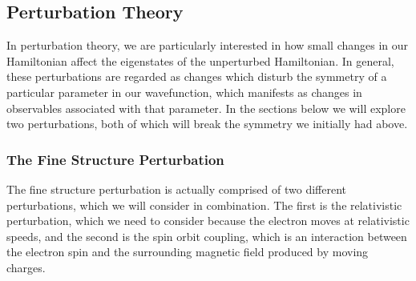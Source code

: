 \documentclass[10pt]{article}
\begin{document}
	\subsection{Perturbation Theory}
	In perturbation theory, we are particularly interested in how small changes in
	our Hamiltonian affect the eigenstates of the unperturbed Hamiltonian. In
	general, these perturbations are regarded as changes which disturb the symmetry
	of a particular parameter in our wavefunction, which manifests as changes in
	observables associated with that parameter. In the sections below we will
	explore two perturbations, both of which will break the symmetry we initially
	had above.       

	\subsubsection{The Fine Structure Perturbation}
	The fine structure perturbation is actually comprised of two different
	perturbations, which we will consider in combination. The first is the
	relativistic perturbation, which we need to consider because the electron moves
	at relativistic speeds, and the second is the spin orbit coupling, which is an
	interaction between the electron spin and the surrounding magnetic field produced
	by moving charges. 
\end{document}
